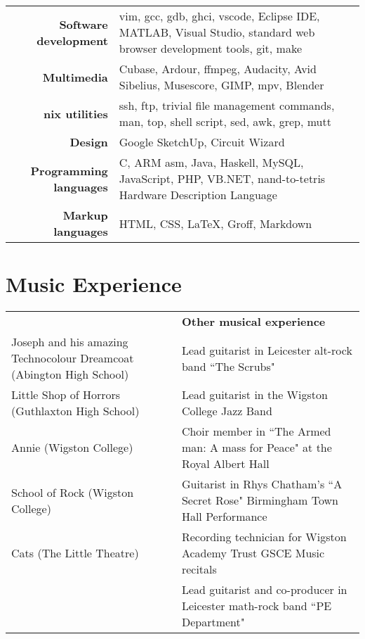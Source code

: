 \documentclass{article}
\begin{document}
{\renewcommand{\arraystretch}{2}

\begin{tabular}{ r | p{10cm} }

{\large\bfseries Software development} & {vim, gcc, gdb, ghci, vscode, Eclipse IDE, MATLAB, Visual Studio, standard web browser development tools, git, make}\\
{\large\bfseries Multimedia} & {Cubase, Ardour, ffmpeg, Audacity, Avid Sibelius, Musescore, GIMP, mpv, Blender} \\
{\large\bfseries *nix utilities} & {ssh, ftp, trivial file management commands, man, top, shell script, sed, awk, grep, mutt} \\
{\large\bfseries Design} & {Google SketchUp, Circuit Wizard} \\
{\large\bfseries Programming languages} & {C, ARM asm, Java, Haskell, MySQL, JavaScript, PHP, VB.NET, nand-to-tetris Hardware Description Language}\\
{\large\bfseries Markup languages} & {HTML, CSS, \LaTeX, Groff, Markdown}\\


\end{tabular}

\section{Music Experience}

{\renewcommand{\arraystretch}{1.4}

\begin{tabular}{>{\centering}p{} | >{\centering}p{} }
{\large\bfseries Shows as a pit-band guitarist} & {\large\bfseries Other musical experience}
\tabularnewline
Joseph and his amazing Technocolour Dreamcoat (Abington High School) & Lead guitarist in Leicester alt-rock band ``The Scrubs"
\tabularnewline
Little Shop of Horrors (Guthlaxton High School) & Lead guitarist in the Wigston College Jazz Band
\tabularnewline
Annie (Wigston College) & Choir member in ``The Armed man: A mass for Peace" at the Royal Albert Hall
\tabularnewline
School of Rock (Wigston College) & Guitarist in Rhys Chatham's ``A Secret Rose" Birmingham Town Hall Performance
\tabularnewline
Cats (The Little Theatre) & Recording technician for Wigston Academy Trust GSCE Music recitals
\tabularnewline
{} & Lead guitarist and co-producer in Leicester math-rock band ``PE Department"

\end{tabular}



}}
\end{document}
